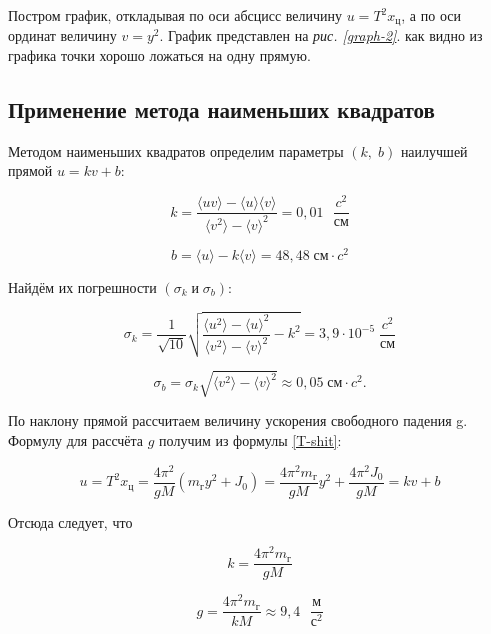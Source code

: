 \documentclass[a4paper,12pt]{article}
\begin{document}
Постром график, откладывая по оси абсцисс величину $u = T^2x_\text{ц}$, а по оси ординат величину $v = y^2$. График представлен на \textit{рис. \ref{graph-2}}. как видно из графика точки хорошо ложаться на одну прямую.

\subsection{Применение метода наименьших квадратов}

Методом наименьших квадратов определим параметры $(k,\;b)$  наилучшей прямой $u = kv + b$:

\begin{equation}
    k = \frac{\langle uv\rangle - \langle u \rangle \langle v \rangle}{\langle v^2 \rangle - \langle v \rangle^2} = 0,01 \text{ } \frac{c^2}{\text{см}}
\end{equation}

\begin{equation}
    b = \langle u \rangle - k\langle v \rangle = 48,48\; \text{см}\cdot c^2 
\end{equation}

Найдём их погрешности $(\sigma_k\;и\;\sigma_b)$:

\begin{equation}
    \sigma_k = \frac{1}{\sqrt{10}} \sqrt{\frac{\langle u^2 \rangle - \langle u \rangle^2}{\langle v^2 \rangle - \langle v \rangle^2} - k^2} = 3,9 \cdot 10^{-5}\; \frac{c^2}{\text{см}}
\end{equation}

\begin{equation}
    \sigma_b = \sigma_k\sqrt{\langle v^2 \rangle - \langle v \rangle^2} \approx 0,05\; см \cdot c^2.
\end{equation}

По наклону прямой рассчитаем величину ускорения свободного падения g. Формулу для рассчёта $g$ получим из формулы \eqref{T-shit}:

\begin{equation}
    u = T^2x_\text{ц} = \frac{4\pi^2}{gM} \left( m_\text{г} y^2 + J_0\right) = 
    \frac{4\pi^2m_\text{г}}{gM}y^2 + \frac{4\pi^2J_0}{gM} = kv + b
\end{equation} 

Отсюда следует, что

\begin{equation}
    k = \frac{4\pi^2m_\text{г}}{gM}
\end{equation} 

\begin{equation}
    g = \frac{4\pi^2m_\text{г}}{kM} \approx 9,4 \text{ } \frac{\text{м}}{\text{с}^2}
\end{equation}
\end{document}
